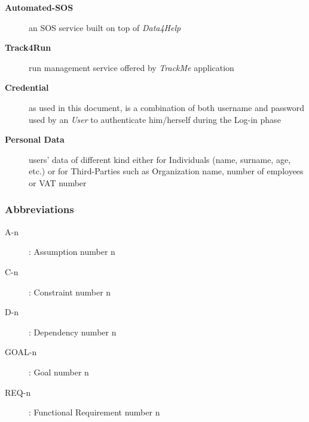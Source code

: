 \documentclass[a4paper]{article}
\begin{document}
\begin{description}
                    \item[\textbf{Automated-SOS}] an SOS service built on top of \textit{Data4Help}
                    
                    \item[\textbf{Track4Run}] run management service offered by \textit{TrackMe} application
                    
                    \item[\textbf{Credential}] as used in this document, is a combination of both username and password used by an \textit{User} to authenticate him/herself during the Log-in phase
                    
                    \item[\textbf{Personal Data}] users' data of different kind either for Individuals (name, surname, age, etc.) or for Third-Parties such as Organization name, number of employees or VAT number
                \end{description}
                
            \subsubsection{Abbreviations}
            \begin{description}
                \item[A-n]: Assumption number n
                \item[C-n]: Constraint number n
                \item[D-n]: Dependency number n
                \item[GOAL-n]: Goal number n
                 \item [REQ-n]: Functional Requirement number n
            \end{description}
            
\end{document}
